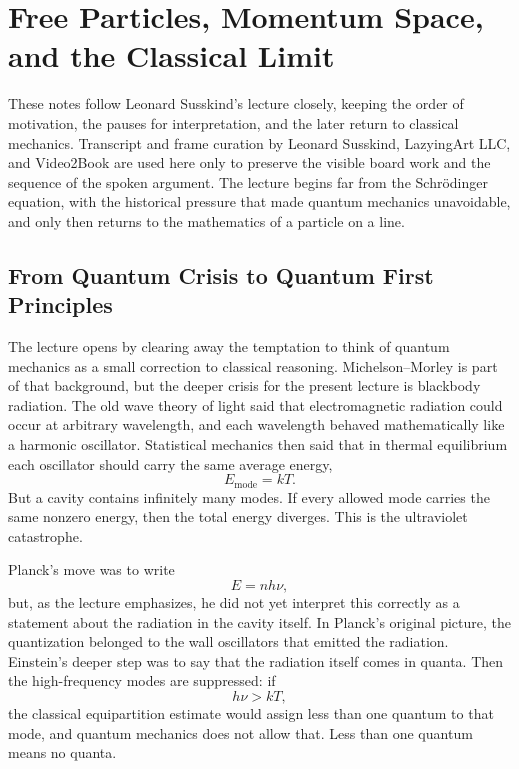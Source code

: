 \chapter{Free Particles, Momentum Space, and the Classical Limit}

These notes follow Leonard Susskind's lecture closely, keeping the order of motivation, the pauses for interpretation, and the later return to classical mechanics. Transcript and frame curation by Leonard Susskind, LazyingArt LLC, and Video2Book are used here only to preserve the visible board work and the sequence of the spoken argument. The lecture begins far from the Schr\"odinger equation, with the historical pressure that made quantum mechanics unavoidable, and only then returns to the mathematics of a particle on a line.

\section{From Quantum Crisis to Quantum First Principles}

The lecture opens by clearing away the temptation to think of quantum mechanics as a small correction to classical reasoning. Michelson--Morley is part of that background, but the deeper crisis for the present lecture is blackbody radiation. The old wave theory of light said that electromagnetic radiation could occur at arbitrary wavelength, and each wavelength behaved mathematically like a harmonic oscillator. Statistical mechanics then said that in thermal equilibrium each oscillator should carry the same average energy,
\begin{equation}
E_{\text{mode}} = kT.
\end{equation}
But a cavity contains infinitely many modes. If every allowed mode carries the same nonzero energy, then the total energy diverges. This is the ultraviolet catastrophe.

Planck's move was to write
\begin{equation}
E = n h \nu,
\end{equation}
but, as the lecture emphasizes, he did not yet interpret this correctly as a statement about the radiation in the cavity itself. In Planck's original picture, the quantization belonged to the wall oscillators that emitted the radiation. Einstein's deeper step was to say that the radiation itself comes in quanta. Then the high-frequency modes are suppressed: if
\begin{equation}
h\nu > kT,
\end{equation}
the classical equipartition estimate would assign less than one quantum to that mode, and quantum mechanics does not allow that. Less than one quantum means no quanta.

